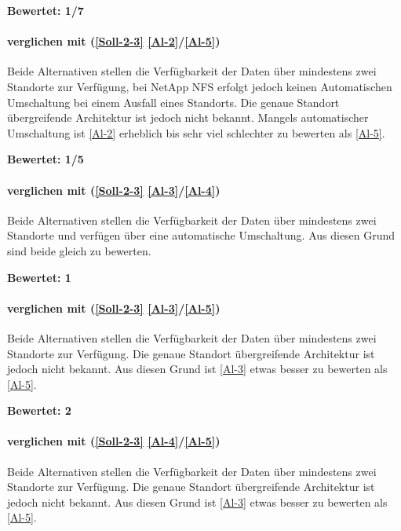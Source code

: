 \textbf{Bewertet: 1/7}

\paragraph*{  verglichen mit  (\ref{Soll-2-3} \ref{Al-2}/\ref{Al-5})}
Beide Alternativen stellen die Verfügbarkeit der Daten über mindestens zwei Standorte zur Verfügung, bei NetApp NFS erfolgt jedoch keinen Automatischen Umschaltung bei einem Ausfall eines Standorts. Die genaue Standort übergreifende Architektur ist jedoch nicht bekannt. Mangels automatischer Umschaltung ist  \ref{Al-2} erheblich bis sehr viel schlechter zu bewerten als  \ref{Al-5}.

\textbf{Bewertet: 1/5}

\paragraph*{  verglichen mit  (\ref{Soll-2-3} \ref{Al-3}/\ref{Al-4})}
Beide Alternativen stellen die Verfügbarkeit der Daten über mindestens zwei Standorte und verfügen über eine automatische Umschaltung. Aus diesen Grund sind beide gleich zu bewerten.

\textbf{Bewertet: 1}

\paragraph*{  verglichen mit  (\ref{Soll-2-3} \ref{Al-3}/\ref{Al-5})}
Beide Alternativen stellen die Verfügbarkeit der Daten über mindestens zwei Standorte zur Verfügung. Die genaue Standort übergreifende Architektur ist jedoch nicht bekannt. Aus diesen Grund ist  \ref{Al-3} etwas besser zu bewerten als  \ref{Al-5}.

\textbf{Bewertet: 2}

\paragraph*{  verglichen mit  (\ref{Soll-2-3} \ref{Al-4}/\ref{Al-5})}
Beide Alternativen stellen die Verfügbarkeit der Daten über mindestens zwei Standorte zur Verfügung. Die genaue Standort übergreifende Architektur ist jedoch nicht bekannt.  Aus diesen Grund ist  \ref{Al-3} etwas besser zu bewerten als  \ref{Al-5}.

